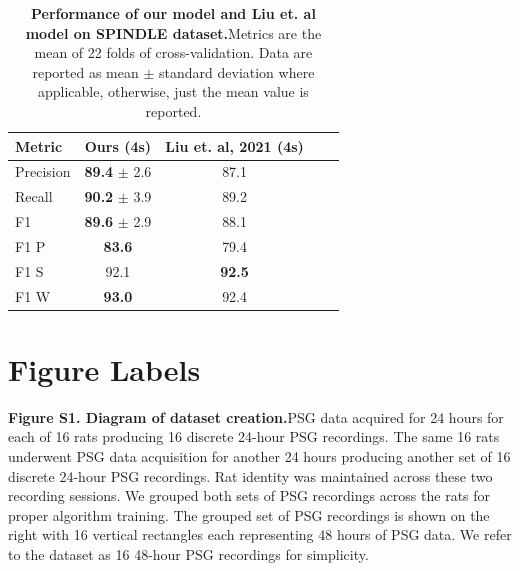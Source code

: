 \documentclass[pdflatex,sn-mathphys-num]{sn-jnl}%
\theoremstyle{thmstyleone}%
\theoremstyle{thmstyletwo}%
\theoremstyle{thmstylethree}%
\newcommand{\liuprecision}{87.1}
\newcommand{\liurecall}{89.2}
\newcommand{\liuf}{88.1}
\newcommand{\liufp}{79.4}
\newcommand{\liufs}{92.5}
\newcommand{\liufw}{92.4}
\newcommand{\spindleprecision}{89.4}
\newcommand{\spindlerecall}{90.2}
\newcommand{\spindlefscore}{89.6}
\newcommand{\spindlefscorep}{83.6}
\newcommand{\spindlefscores}{92.1}
\newcommand{\spindlefscorew}{93.0}
\newcommand{\spindleprecisionstd}{2.6}
\newcommand{\spindlerecallstd}{3.9}
\newcommand{\spindlefscorestd}{2.9}
\begin{document}
\begin{table}[ht]
    \caption{\textbf{Performance of our model and Liu et. al \cite{liu_attention-based_2022} model on SPINDLE dataset.}\quad Metrics are the mean of 22 folds of cross-validation. Data are reported as mean $\pm$ standard deviation where applicable, otherwise, just the mean value is reported.}
    \label{metrics_spindle}
    \vskip 0.15in
    \begin{centering}
    \begin{small}
    \begin{sc}
    \begin{tabular}{lcccr}
    \toprule
    Metric & Ours (4s) & Liu et. al, 2021 (4s) \cite{liu_attention-based_2022}\\
    \midrule
    Precision & \textbf{\spindleprecision} $\pm$ \spindleprecisionstd &\liuprecision\\
    Recall    & \textbf{\spindlerecall} $\pm$ \spindlerecallstd &\liurecall\\
    F1        & \textbf{\spindlefscore} $\pm$ \spindlefscorestd &\liuf\\
    F1 P      & \textbf{\spindlefscorep}           &\liufp\\
    F1 S      & \spindlefscores                    &\textbf{\liufs}\\
    F1 W      & \textbf{\spindlefscorew}           &\liufw\\
    \bottomrule
    \end{tabular}
    \end{sc}
    \end{small}
    \end{centering}
    \vskip -0.1in
\end{table}
\section*{Figure Labels}
\noindent
\textbf{Figure S1. Diagram of dataset creation.}\quad PSG data acquired for 24 hours for each of 16 rats producing 16 discrete 24-hour PSG recordings. The same 16 rats underwent PSG data acquisition for another 24 hours producing another set of 16 discrete 24-hour PSG recordings. Rat identity was maintained across these two recording sessions. We grouped both sets of PSG recordings across the rats for proper algorithm training. The grouped set of PSG recordings is shown on the right with 16 vertical rectangles each representing 48 hours of PSG data. We refer to the dataset as 16 48-hour PSG recordings for simplicity.
\end{document}
